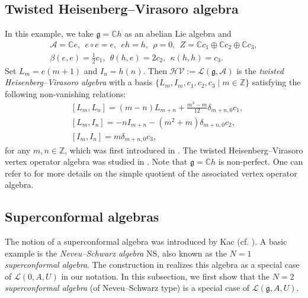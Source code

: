\documentclass[12pt]{article}
\numberwithin{equation}{section}
\theoremstyle{definition}
\theoremstyle{plain}
\newcommand{\bC}{\ensuremath{\mathbb{C}}}
\newcommand{\bZ}{\ensuremath{\mathbb{Z}}}
\newcommand{\fg}{\mathfrak{g}}
\newcommand{\cA}{\ensuremath{\mathcal{A}}}
\newcommand{\cL}{\ensuremath{\mathcal{L}}}
\begin{document}
\subsection{Twisted Heisenberg--Virasoro algebra}
\hspace{1.5em}In this example, we take $\fg=\bC h$ as an abelian Lie algebra and
\begin{gather*}
    \cA=\bC e,\ \ e\circ e=e,\ \ eh=h,\ \ \rho=0,\ \ Z=\bC c_1\oplus\bC c_2\oplus \bC c_3,\\ 
    \beta(e,e)=\frac{1}{2}c_1,\ \ \theta(h,e)=2c_2,\ \ \kappa(h,h)=c_3.
\end{gather*}
Set $L_m=e(m+1)$ and $I_n=h(n)$. Then $\mathcal{HV}:=\cL(\fg,\cA)$ is the \emph{twisted Heisenberg--Virasoro algebra} with a basis $\{L_m,I_m,c_1,c_2,c_3\mid m\in\bZ\}$ satisfying the following non-vanishing relations:
\begin{align*}
    &[L_m,L_n]=(m-n)L_{m+n}+\frac{m^3-m}{12}\delta_{m+n,0}c_1,\\
    &[L_m,I_n]=-nI_{m+n}-(m^2+m)\delta_{m+n,0}c_2,\\
    &[I_m,I_n]=m\delta_{m+n,0}c_3,
\end{align*}
for any $m,n\in\bZ$, which was first introduced in \cite{ACKP}. The twisted Heisenberg--Virasoro vertex operator algebra was studied in \cite{GW}. Note that $\fg=\bC h$ is non-perfect. One can refer to \cite{GW} for more details on the simple quotient of the associated vertex operator algebra.


\subsection{Superconformal algebras}
\hspace{1.5em}The notion of a superconformal algebra was introduced by Kac (cf. \cite{K98}). A basic example is the \emph{Neveu--Schwarz algebra} $\mathrm{NS}$, also known as the $N=1$ \emph{superconformal algebra}. The construction in \cite{LY} realizes this algebra as a special case of $\cL(0,A,U)$ in our notation. In this subsection, we first show that the $N=2$ \emph{superconformal algebra} (of Neveu--Schwarz type) is a special case of $\cL(\fg,A,U)$.
\end{document}
